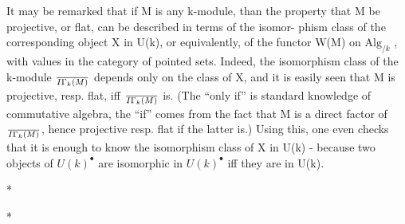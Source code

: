 
It may be remarked that if M is any k-module,  than the property
that M be projective,  or flat,  can be described in terms of the isomor-%
phism class of the corresponding object X in U(k)\hand{$^\bullet$},  or equivalently, of
the functor W(M) on $\mathrm{Alg}_{/k}$ ,  with values in the category of pointed sets.
Indeed, the isomorphism class of the k-module $\over{I}{\Gamma}_k(M)$  depends only on the
class of X,  and it is easily seen that M is projective, resp. flat, iff
$\over{I}{\Gamma}_k(M)$ is.  (The ``only if'' is standard knowledge of commutative algebra,
the ``if'' comes from the fact that M is a direct factor of $\over{I}{\Gamma}_k(M)$,  hence
projective resp. flat if the latter is.)  Using this,  one even checks
that it is enough to know the isomorphism class of X in U(k)  -  because
two objects of $U(k)^\bullet$  are isomorphic in $U(k)^\bullet$  iff they are in U(k).

* \quad *

*

